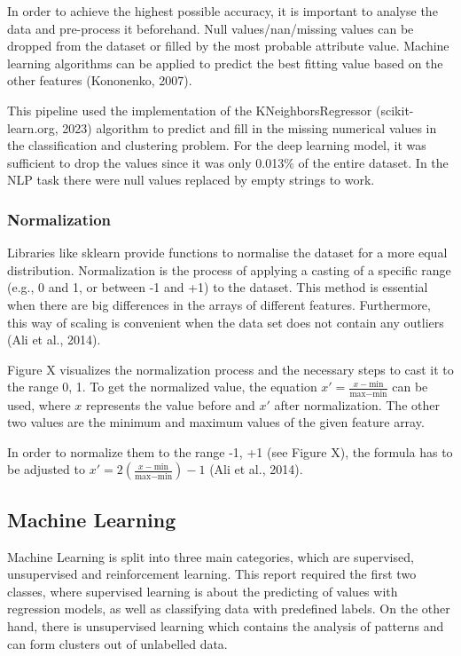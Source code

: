 \documentclass{article}
\begin{document}
\begin{multicols}{2}
In order to achieve the highest possible accuracy, it is important to analyse the data and pre-process it beforehand. Null values/nan/missing values can be dropped from the dataset or filled by the most probable attribute value. Machine learning algorithms can be applied to predict the best fitting value based on the other features (Kononenko, 2007).

This pipeline used the implementation of the KNeighborsRegressor (scikit-learn.org, 2023) algorithm to predict and fill in the missing numerical values in the classification and clustering problem. For the deep learning model, it was sufficient to drop the values since it was only 0.013\% of the entire dataset. In the NLP task there were null values replaced by empty strings to work.

\subsubsection{Normalization}

Libraries like sklearn provide functions to normalise the dataset for a more equal distribution. Normalization is the process of applying a casting of a specific range (e.g., 0 and 1, or between -1 and +1) to the dataset. This method is essential when there are big differences in the arrays of different features. Furthermore, this way of scaling is convenient when the data set does not contain any outliers (Ali et al., 2014).

Figure X visualizes the normalization process and the necessary steps to cast it to the range 0, 1. To get the normalized value, the equation \(x' = \frac{x - \text{min}}{\text{max} - \text{min}}\) can be used, where \(x\) represents the value before and \(x'\) after normalization. The other two values are the minimum and maximum values of the given feature array.

In order to normalize them to the range -1, +1 (see Figure X), the formula has to be adjusted to \(x' = 2 \left( \frac{x - \text{min}}{\text{max} - \text{min}} \right) - 1\) (Ali et al., 2014).


\subsection{Machine Learning}

Machine Learning is split into three main categories, which are supervised, unsupervised and reinforcement learning. This report required the first two classes, where supervised learning is about the predicting of values with regression models, as well as classifying data with predefined labels. On the other hand, there is unsupervised learning which contains the analysis of patterns and can form clusters out of unlabelled data.


\end{multicols}
\end{document}

